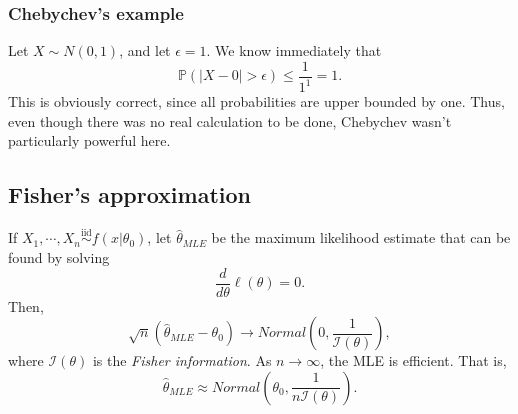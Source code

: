 \documentclass[titlepage, 12pt, leqno]{article}
\begin{document}
\subsubsection{Chebychev's example}
Let $X \sim N(0,1)$, and let $\epsilon = 1$. We know immediately that
\[
    \mathbb{P}(|X-0|>\epsilon) \le \frac{1}{1^{1}} = 1.
\]
This is obviously correct, since all probabilities are upper bounded by one.
Thus, even though there was no real calculation to be done, Chebychev wasn't
particularly powerful here.

\subsection{Fisher's approximation}
If $X_{1}, \cdots ,X_{n} \overset{\mathrm{iid}}{\sim}f(x|\theta_{0})$, let
$\hat \theta_{MLE}$ be the maximum likelihood estimate that can be found by
solving 
\[
\frac{d}{d \theta}\ell(\theta) = 0.
\]
Then,
\[
    \sqrt{n}(\hat \theta_{MLE} - \theta_{0}) \rightarrow Normal\left(0, 
    \frac{1}{\mathcal{I}(\theta)}\right),
\]
where $\mathcal{I}(\theta)$ is the \textit{Fisher information}. As
$n \rightarrow \infty$, the MLE is efficient. That is,
\[
    \hat \theta_{MLE} \approx Normal\left(\theta_{0},
    \frac{1}{n\mathcal{I}(\theta)}\right).
\]
\end{document}
